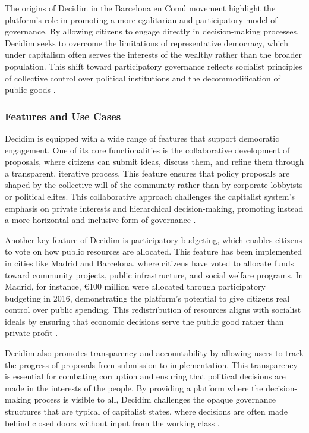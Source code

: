 \begin{refsection}
The origins of Decidim in the Barcelona en Comú movement highlight the platform’s role in promoting a more egalitarian and participatory model of governance. By allowing citizens to engage directly in decision-making processes, Decidim seeks to overcome the limitations of representative democracy, which under capitalism often serves the interests of the wealthy rather than the broader population. This shift toward participatory governance reflects socialist principles of collective control over political institutions and the decommodification of public goods \cite[pp.~77-90]{dardot2014}.

\subsubsection{Features and Use Cases}

Decidim is equipped with a wide range of features that support democratic engagement. One of its core functionalities is the collaborative development of proposals, where citizens can submit ideas, discuss them, and refine them through a transparent, iterative process. This feature ensures that policy proposals are shaped by the collective will of the community rather than by corporate lobbyists or political elites. This collaborative approach challenges the capitalist system’s emphasis on private interests and hierarchical decision-making, promoting instead a more horizontal and inclusive form of governance \cite[pp.~45-60]{smith2009}.

Another key feature of Decidim is participatory budgeting, which enables citizens to vote on how public resources are allocated. This feature has been implemented in cities like Madrid and Barcelona, where citizens have voted to allocate funds toward community projects, public infrastructure, and social welfare programs. In Madrid, for instance, €100 million were allocated through participatory budgeting in 2016, demonstrating the platform’s potential to give citizens real control over public spending. This redistribution of resources aligns with socialist ideals by ensuring that economic decisions serve the public good rather than private profit \cite[pp.~45-67]{scholz2017}.

Decidim also promotes transparency and accountability by allowing users to track the progress of proposals from submission to implementation. This transparency is essential for combating corruption and ensuring that political decisions are made in the interests of the people. By providing a platform where the decision-making process is visible to all, Decidim challenges the opaque governance structures that are typical of capitalist states, where decisions are often made behind closed doors without input from the working class \cite[pp.~77-90]{dardot2014}.


\end{refsection}
